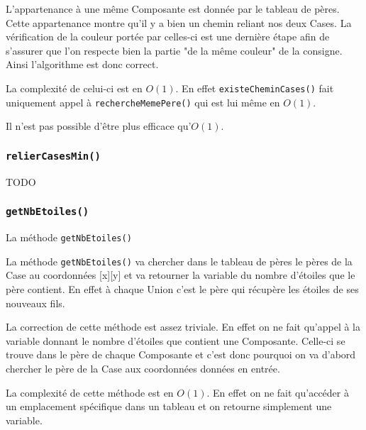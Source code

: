 \documentclass{article}
\newcommand{\info}{\texttt}
\begin{document}
                L'appartenance à une même Composante est donnée par le tableau de pères. Cette appartenance montre qu'il y a bien un chemin reliant nos deux Cases. La vérification de la couleur portée par celles-ci est une dernière étape afin de s'assurer que l'on respecte bien la partie "de la même couleur" de la consigne. Ainsi l'algorithme est donc correct.
                
                La complexité de celui-ci est en $O(1)$. En effet \info{existeCheminCases()} fait uniquement appel à \info{rechercheMemePere()} qui est lui même en $O(1)$.
                
                Il n'est pas possible d'être plus efficace qu'$O(1)$.
                
            \subsubsection{\info{relierCasesMin()}}
            
                TODO
                
            \subsubsection{\info{getNbEtoiles()}}
                
                \begin{algorithm}[H]
                \caption{La méthode \info{getNbEtoiles()}}
                \end{algorithm}
                
                La méthode \info{getNbEtoiles()} va chercher dans le tableau de pères le pères de la Case au coordonnées [x][y] et va retourner la variable du nombre d'étoiles que le père contient. En effet à chaque Union c'est le père qui récupère les étoiles de ses nouveaux fils.
                
                La correction de cette méthode est assez triviale. En effet on ne fait qu'appel à la variable donnant le nombre d'étoiles que contient une Composante. Celle-ci se trouve dans le père de chaque Composante et c'est donc pourquoi on va d'abord chercher le père de la Case aux coordonnées données en entrée.
                
                La complexité de cette méthode est en $O(1)$. En effet on ne fait qu'accéder à un emplacement spécifique dans un tableau et on retourne simplement une variable.
                
\end{document}
